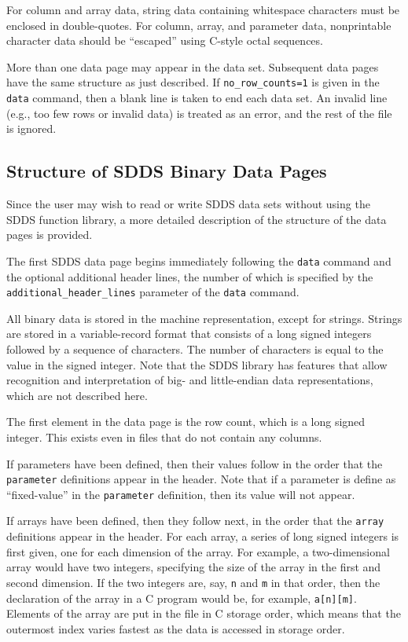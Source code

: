 \documentclass[11pt]{article}
\begin{document}
For column and array data, string data containing whitespace characters must be enclosed in double-quotes.  For column, array, and parameter data, nonprintable character data should be ``escaped'' using C-style octal sequences.

More than one data page may appear in the data set.  Subsequent data pages have the same structure as just described. If \verb|no_row_counts=1| is given in the {\tt data} command, then a blank line is taken to end each data set.  An invalid line (e.g., too few rows or invalid data) is treated as an error, and the rest of the file is ignored.

\subsection{Structure of SDDS Binary Data Pages}

Since the user may wish to read or write SDDS data sets without using the SDDS function library, a more detailed description of the structure of the data pages is provided. 

The first SDDS data page begins immediately following the {\tt data}
command and the optional additional header lines, the number of which
is specified by the \verb|additional_header_lines| parameter of the
{\tt data} command.

All binary data is stored in the machine representation, except for
strings.  Strings are stored in a variable-record format that consists
of a long signed integers followed by a sequence of characters.  The number
of characters is equal to the value in the signed integer.  Note that
the SDDS library has features that allow recognition and interpretation
of big- and little-endian data representations, which are not described here.

The first element in the data page is the row count, which is a long
signed integer.  This exists even in files that do not contain any
columns.

If parameters have been defined, then their values follow in the order
that the {\tt parameter} definitions appear in the header.  Note that
if a parameter is define as ``fixed-value'' in the {\tt parameter}
definition, then its value will not appear.

If arrays have been defined, then they follow next, in the order that
the {\tt array} definitions appear in the header.  For each array, a
series of long signed integers is first given, one for each dimension
of the array.  For example, a two-dimensional array would have two
integers, specifying the size of the array in the first and second
dimension.  If the two integers are, say, {\tt n} and {\tt m} in that
order, then the declaration of the array in a C program would be, for
example, {\tt a[n][m]}.  Elements of the array are put in the file in
C storage order, which means that the outermost index varies fastest
as the data is accessed in storage order.
\end{document}
